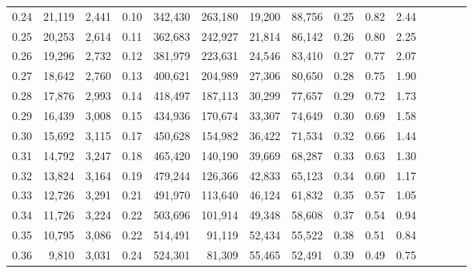 \begin{tabular}{rrrcrrrrrrrrrrr}
0.24 &  21,119 &  2,441 &                                       0.10 &  342,430 &  263,180 &   19,200 &   88,756 &  0.25 &  0.82 &                         2.44 \\
0.25 &  20,253 &  2,614 &                                       0.11 &  362,683 &  242,927 &   21,814 &   86,142 &  0.26 &  0.80 &                         2.25 \\
0.26 &  19,296 &  2,732 &                                       0.12 &  381,979 &  223,631 &   24,546 &   83,410 &  0.27 &  0.77 &                         2.07 \\
0.27 &  18,642 &  2,760 &                                       0.13 &  400,621 &  204,989 &   27,306 &   80,650 &  0.28 &  0.75 &                         1.90 \\
0.28 &  17,876 &  2,993 &                                       0.14 &  418,497 &  187,113 &   30,299 &   77,657 &  0.29 &  0.72 &                         1.73 \\
0.29 &  16,439 &  3,008 &                                       0.15 &  434,936 &  170,674 &   33,307 &   74,649 &  0.30 &  0.69 &                         1.58 \\
0.30 &  15,692 &  3,115 &                                       0.17 &  450,628 &  154,982 &   36,422 &   71,534 &  0.32 &  0.66 &                         1.44 \\
0.31 &  14,792 &  3,247 &                                       0.18 &  465,420 &  140,190 &   39,669 &   68,287 &  0.33 &  0.63 &                         1.30 \\
0.32 &  13,824 &  3,164 &                                       0.19 &  479,244 &  126,366 &   42,833 &   65,123 &  0.34 &  0.60 &                         1.17 \\
0.33 &  12,726 &  3,291 &                                       0.21 &  491,970 &  113,640 &   46,124 &   61,832 &  0.35 &  0.57 &                         1.05 \\
0.34 &  11,726 &  3,224 &                                       0.22 &  503,696 &  101,914 &   49,348 &   58,608 &  0.37 &  0.54 &                         0.94 \\
0.35 &  10,795 &  3,086 &                                       0.22 &  514,491 &   91,119 &   52,434 &   55,522 &  0.38 &  0.51 &                         0.84 \\
0.36 &   9,810 &  3,031 &                                       0.24 &  524,301 &   81,309 &   55,465 &   52,491 &  0.39 &  0.49 &                         0.75 \\

\end{tabular}
